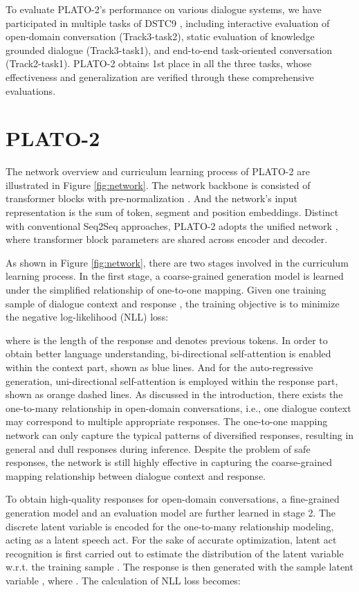 \documentclass[letterpaper]{article} \usepackage{aaai21}  \usepackage{times}  \usepackage{helvet} \usepackage{courier}  \usepackage[hyphens]{url}  \usepackage{graphicx} \urlstyle{rm} \def\UrlFont{\rm}  \usepackage{natbib}  \usepackage{caption} \frenchspacing  \setlength{\pdfpagewidth}{8.5in}  \setlength{\pdfpageheight}{11in}  \usepackage{amsmath}
\begin{document}
To evaluate PLATO-2's performance on various dialogue systems, we have participated in multiple tasks of DSTC9 \cite{gunasekara2020overview}, including interactive evaluation of open-domain conversation (Track3-task2), static evaluation of knowledge grounded dialogue (Track3-task1), and end-to-end task-oriented conversation (Track2-task1). PLATO-2 obtains 1st place in all the three tasks, whose effectiveness and generalization are verified through these comprehensive evaluations. 

\section{PLATO-2}
The network overview and curriculum learning process of PLATO-2 are illustrated in Figure \ref{fig:network}. The network backbone is consisted of transformer blocks with pre-normalization \cite{vaswani2017attention, radford2019language}. And the network's input representation is the sum of token, segment and position embeddings. Distinct with conventional Seq2Seq approaches, PLATO-2 adopts the unified network \cite{dong2019unified, bao2019plato}, where transformer block parameters are shared across encoder and decoder. 

As shown in Figure \ref{fig:network}, there are two stages involved in the curriculum learning process. In the first stage, a coarse-grained generation model is learned under the simplified relationship of one-to-one mapping. Given one training sample of dialogue context and response , the training objective is to minimize the negative log-likelihood (NLL) loss:

where  is the length of the response and  denotes previous tokens. In order to obtain better language understanding, bi-directional self-attention is enabled within the context part, shown as blue lines. And for the auto-regressive generation, uni-directional self-attention is employed within the response part, shown as orange dashed lines. As discussed in the introduction, there exists the one-to-many relationship in open-domain conversations, i.e., one dialogue context may correspond to multiple appropriate responses. The one-to-one mapping network can only capture the typical patterns of diversified responses, resulting in general and dull responses during inference. Despite the problem of safe responses, the network is still highly effective in capturing the coarse-grained mapping relationship between dialogue context and response. 

To obtain high-quality responses for open-domain conversations, a fine-grained generation model and an evaluation model are further learned in stage 2. The discrete latent variable is encoded for the one-to-many relationship modeling, acting as a latent speech act. For the sake of accurate optimization, latent act recognition is first carried out to estimate the distribution of the latent variable w.r.t. the training sample . The response is then generated with the sample latent variable , where . The calculation of NLL loss becomes:
\end{document}
